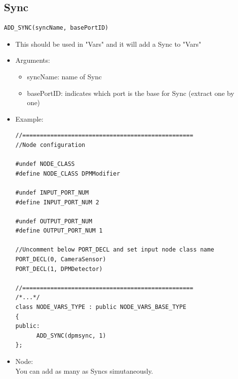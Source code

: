 \documentclass[a4paper,10pt]{book}
\begin{document}
\subsection{Sync}

\begin{mdframed}
\begin{verbatim}
ADD_SYNC(syncName, basePortID)
\end{verbatim}
\begin{itemize}
 \item This should be used in "Vars" and it will add a Sync to "Vars"
 \item Arguments:
 \begin{itemize}
  \item syncName: name of Sync
  \item basePortID: indicates which port is the base for Sync (extract one by one)
 \end{itemize}
 \item Example:
\begin{verbatim}
//=================================================
//Node configuration

#undef NODE_CLASS
#define NODE_CLASS DPMModifier

#undef INPUT_PORT_NUM
#define INPUT_PORT_NUM 2

#undef OUTPUT_PORT_NUM
#define OUTPUT_PORT_NUM 1

//Uncomment below PORT_DECL and set input node class name
PORT_DECL(0, CameraSensor)
PORT_DECL(1, DPMDetector)

//=================================================
/*...*/
class NODE_VARS_TYPE : public NODE_VARS_BASE_TYPE
{
public:
      ADD_SYNC(dpmsync, 1)
};
\end{verbatim}
\item  Node: \\ You can add as many as Syncs simutaneously.
\end{itemize}
\end{mdframed}
\end{document}
